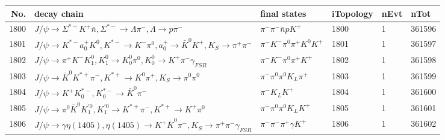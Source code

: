 \begin{table}[htbp] 
\begin{center}
\begin{small}
\begin{tabular}{rlllll}\hline\hline
 No. & decay chain & final states &  iTopology & nEvt & nTot \\\hline
1800&$J/\psi       \rightarrow \Sigma^{*-}       K^{+}          \bar{n}          , \Sigma^{*-}        \rightarrow \Lambda           \pi^{-}        , \Lambda            \rightarrow p                 \pi^{-}        $&$\pi^{-}        \pi^{-}        \bar{n}          p                 K^{+}          $& 1800&    1&361596\\
1801&$J/\psi       \rightarrow K^{*-}         a_{0}^{+}      K^{0}          , K^{*-}          \rightarrow K^{-}          \pi^{0}        , a_{0}^{+}       \rightarrow \bar{K}^{0}   K^{+}          , K_{S}           \rightarrow \pi^{+}        \pi^{-}        $&$\pi^{-}        K^{-}          \pi^{0}        \pi^{+}        K^{0}          K^{+}          $& 1801&    1&361597\\
1802&$J/\psi       \rightarrow \pi^{+}        K^{-}          K_1^{0}        , K_1^{0}         \rightarrow K_0^{0}        \pi^{0}        , K_0^{0}         \rightarrow K^{+}          \pi^{-}        \gamma_{FSR} $&$\pi^{-}        K^{-}          \pi^{0}        \pi^{+}        K^{+}          $& 1802&    1&361598\\
1803&$J/\psi       \rightarrow \bar{K}^{0}   K^{*+}         \pi^{-}        , K^{*+}          \rightarrow K^{0}          \pi^{+}        , K_{S}           \rightarrow \pi^{0}        \pi^{0}        $&$\pi^{-}        \pi^{0}        \pi^{0}        K_{L}          \pi^{+}        $& 1803&    1&361599\\
1804&$J/\psi       \rightarrow K^{+}          K_{0}^{*-}     , K_{0}^{*-}      \rightarrow \bar{K}^{0}   \pi^{-}        $&$\pi^{-}        K_{L}          K^{+}          $& 1804&    1&361600\\
1805&$J/\psi       \rightarrow \pi^{0}        \bar{K}^{0}   K_1^{'0}      , K_1^{'0}       \rightarrow K^{*+}         \pi^{-}        , K^{*+}          \rightarrow K^{+}          \pi^{0}        $&$\pi^{-}        \pi^{0}        \pi^{0}        K_{L}          K^{+}          $& 1805&    1&361601\\
1806&$J/\psi       \rightarrow \gamma       \eta(1405)    , \eta(1405)     \rightarrow K^{+}          \bar{K}^{0}   \pi^{-}        , K_{S}           \rightarrow \pi^{+}        \pi^{-}        \gamma_{FSR} $&$\pi^{-}        \pi^{-}        \pi^{+}        \gamma       K^{+}          $& 1806&    1&361602\\

\end{tabular}
\end{small}
\end{center}
\end{table}
